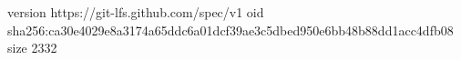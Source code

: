 version https://git-lfs.github.com/spec/v1
oid sha256:ca30e4029e8a3174a65ddc6a01dcf39ae3c5dbed950e6bb48b88dd1acc4dfb08
size 2332
